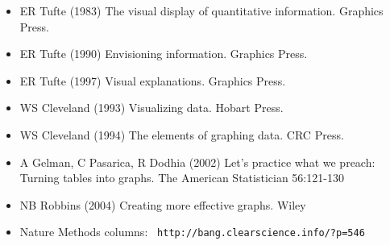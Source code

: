 \documentclass[12pt]{article}
\begin{document}
\hspace{0.5in} \begin{minipage}[t]{9in}
\begin{itemize}

\itemsep12pt

\item ER Tufte (1983) The visual display of quantitative information.
Graphics Press.
\item ER Tufte (1990) Envisioning information. Graphics Press.
\item ER Tufte (1997) Visual explanations. Graphics Press.

\vspace*{8mm}

\item WS Cleveland (1993) Visualizing data. Hobart Press.
\item WS Cleveland (1994) The elements of graphing data. CRC Press.

\vspace*{8mm}

\item A Gelman, C Pasarica, R Dodhia (2002) Let's practice what we preach:
Turning tables into graphs. The American Statistician 56:121-130

\vspace*{8mm}

\item NB Robbins (2004) Creating more effective graphs. Wiley

\vspace*{8mm}

\item Nature Methods columns: {\tt \color{myblue} http://bang.clearscience.info/?p=546}

\end{itemize}
\end{minipage}
\end{document}
